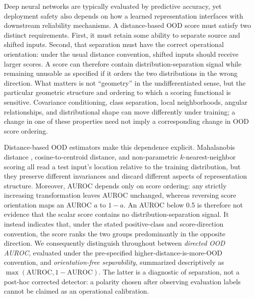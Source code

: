 Deep neural networks are typically evaluated by predictive accuracy, yet deployment safety also depends on how a learned representation interfaces with downstream reliability mechanisms. A distance-based OOD score must satisfy two distinct requirements. First, it must retain some ability to separate source and shifted inputs. Second, that separation must have the correct operational orientation: under the usual distance convention, shifted inputs should receive larger scores. A score can therefore contain distribution-separation signal while remaining unusable as specified if it orders the two distributions in the wrong direction. What matters is not ``geometry'' in the undifferentiated sense, but the particular geometric structure and ordering to which a scoring functional is sensitive. Covariance conditioning, class separation, local neighborhoods, angular relationships, and distributional shape can move differently under training; a change in one of these properties need not imply a corresponding change in OOD score ordering.

Distance-based OOD estimators make this dependence explicit. Mahalanobis distance \citep{lee2018simple}, cosine-to-centroid distance, and non-parametric $k$-nearest-neighbor scoring \citep{sun2022knn} all read a test input's location relative to the training distribution, but they preserve different invariances and discard different aspects of representation structure. Moreover, AUROC depends only on score ordering: any strictly increasing transformation leaves AUROC unchanged, whereas reversing score orientation maps an AUROC $a$ to $1-a$. An AUROC below 0.5 is therefore not evidence that the scalar score contains no distribution-separation signal. It instead indicates that, under the stated positive-class and score-direction convention, the score ranks the two groups predominantly in the opposite direction. We consequently distinguish throughout between \emph{directed OOD AUROC}, evaluated under the pre-specified higher-distance-is-more-OOD convention, and \emph{orientation-free separability}, summarized descriptively as $\max(\mathrm{AUROC},1-\mathrm{AUROC})$. The latter is a diagnostic of separation, not a post-hoc corrected detector: a polarity chosen after observing evaluation labels cannot be claimed as an operational calibration.

